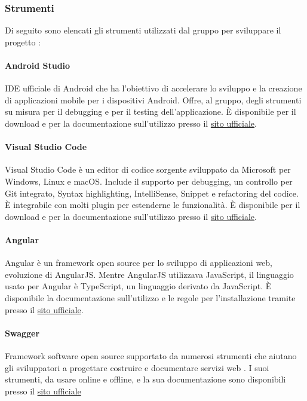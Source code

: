 \subsubsection{Strumenti}
Di seguito sono elencati gli strumenti utilizzati dal gruppo per sviluppare il progetto \glo{\NomeProgetto{}}:

\paragraph{Android Studio}
IDE ufficiale di Android che ha l'obiettivo di accelerare lo sviluppo e la creazione di applicazioni mobile per i dispositivi Android.
Offre, al gruppo, degli strumenti su misura per il debugging e per il testing dell'applicazione. È disponibile per il download e per la documentazione sull'utilizzo presso il \href{https://developer.android.com/studio}{sito ufficiale}.

\paragraph{Visual Studio Code}
Visual Studio Code è un editor di codice sorgente sviluppato da Microsoft per Windows, Linux e macOS. Include il supporto per debugging, un controllo per Git integrato, Syntax highlighting, IntelliSense, Snippet e refactoring del codice.
È integrabile con molti plugin per estenderne le funzionalità. È disponibile per il download e per la documentazione sull'utilizzo presso il \href{https://code.visualstudio.com/}{sito ufficiale}.

\paragraph{Angular}
Angular è un framework open source per lo sviluppo di applicazioni web, evoluzione di AngularJS. Mentre AngularJS utilizzava JavaScript, il linguaggio usato per Angular è TypeScript, un linguaggio derivato da JavaScript.
È disponibile la documentazione sull'utilizzo e le regole per l'installazione tramite  presso il \href{https://angular.io/}{sito ufficiale}.

\paragraph{Swagger}
Framework software open source supportato da numerosi strumenti che aiutano gli sviluppatori a progettare costruire e documentare servizi web .
I suoi strumenti, da usare online e offline, e la sua documentazione sono disponibili presso il \href{https://swagger.io/}{sito ufficiale}

